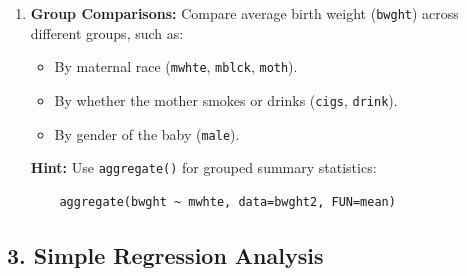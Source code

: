 \documentclass[11pt,a4paper,english]{article}
\begin{document}
\begin{enumerate}[itemsep=-0.5ex]
    \item \textbf{Group Comparisons:}  Compare average birth weight (\texttt{bwght}) across different groups, such as:
    \begin{itemize}[itemsep=-0.5ex]
                   \item By maternal race (\texttt{mwhte}, \texttt{mblck}, \texttt{moth}).
            \item By whether the mother smokes or drinks (\texttt{cigs}, \texttt{drink}).
            \item By gender of the baby (\texttt{male}).
        \end{itemize}
        \textbf{Hint:} Use \texttt{aggregate()} for grouped summary statistics:
    \begin{verbatim}
    aggregate(bwght ~ mwhte, data=bwght2, FUN=mean)
    \end{verbatim}
   \end{enumerate}

\subsection*{3. Simple Regression Analysis}
\end{document}
